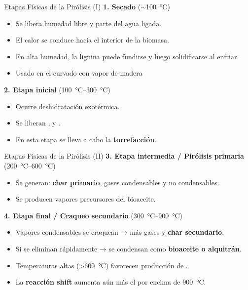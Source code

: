 \documentclass[../../main.tex]{subfiles}
\begin{document}
\begin{frame}{Etapas Físicas de la Pirólisis (I)}
\small
\textbf{1. Secado} ($\sim$\SI{100}{\degreeCelsius})
\begin{itemize}
  \item Se libera humedad libre y parte del agua ligada.
  \item El calor se conduce hacia el interior de la biomasa.
  \item En alta humedad, la lignina puede fundirse y luego solidificarse al enfriar.
  \item Usado en el curvado con vapor de madera %
\end{itemize}

\vspace{0.2cm}
\textbf{2. Etapa inicial} (\SI{100}{\degreeCelsius}–\SI{300}{\degreeCelsius})
\begin{itemize}
  \item Ocurre deshidratación exotérmica.
  \item Se liberan ,  y .
  \item En esta etapa se lleva a cabo la \textbf{torrefacción}.
\end{itemize}
\end{frame}

\begin{frame}{Etapas Físicas de la Pirólisis (II)}
\small
\textbf{3. Etapa intermedia / Pirólisis primaria} (\SI{200}{\degreeCelsius}–\SI{600}{\degreeCelsius})
\begin{itemize}
  \item Se generan: \textbf{char primario}, gases condensables y no condensables.
  \item Se producen vapores precursores del bioaceite.
\end{itemize}

\vspace{0.2cm}
\textbf{4. Etapa final / Craqueo secundario} (\SI{300}{\degreeCelsius}–\SI{900}{\degreeCelsius})
\begin{itemize}
  \item Vapores condensables se craquean → más gases y \textbf{char secundario}.
  \item Si se eliminan rápidamente → se condensan como \textbf{bioaceite o alquitrán}.
  \item Temperaturas altas (\SI{>600}{\degreeCelsius}) favorecen producción de .
  \item La \textbf{reacción shift} aumenta aún más el  por encima de \SI{900}{\degreeCelsius}.
\end{itemize}
\end{frame}
\end{document}
